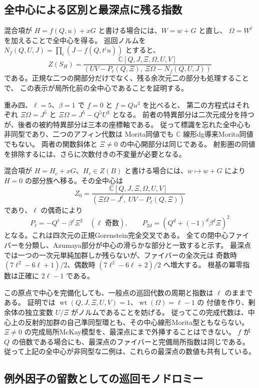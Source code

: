 \subsection{全中心による区別と最深点に残る指数}

混合項が $H=f(Q,u)+xG$ と書ける場合には、$W=w+G$ と直し、
$\Omega=W^\ell$ を加えることで全中心を得る。
巡回ノルムを $N_f(Q,U,J)=\prod_i(J-f(Q,t^iu))$ とすると、
\[
 Z(S_H)=\frac{\mathbb C[Q,J,\Xi,\Omega,U,V]}
 {(UV-P_\ell(Q,\Xi),\ \Xi\Omega-N_f(Q,U,J))}
\]
である。正規な二つの開部分だけでなく、残る余次元二の部分も処理することで、
この表示が局所化前の全中心であることを証明する。

重み四、$\ell=5$、$\beta=1$ で $f=0$ と $f=Qu^3$ を比べると、
第二の方程式はそれぞれ $\Xi\Omega=J^5$ と
$\Xi\Omega=J^5-Q^5U^3$ となる。
前者の特異部分は二次元成分を持つが、後者の被約特異部分は三本の座標軸である。
従って標識を忘れた全中心も非同型であり、二つのアフィン代数は
Morita同値でも $\mathbb C$ 線形dg導来Morita同値でもない。
両者の関数斜体と $\Xi\ne0$ の中心開部分は同じである。
射影圏の同値を排除するには、さらに次数付きの不変量が必要となる。

混合項が $H=H_c+xG$、$H_c\in Z(B)$ と書ける場合には、$w\mapsto w+G$ により
$H=0$ の部分族へ移る。その全中心は
\[
 Z_0=\frac{\mathbb C[Q,J,\Xi,\Omega,U,V]}
 {(\Xi\Omega-J^\ell,\ UV-P_\ell(Q,\Xi))}
\]
であり、$\ell$ の偶奇により
\[
 P_\ell=-Q^\ell-\beta^\ell\Xi^2\quad(\ell\text{ 奇数}),\qquad
 P_{2d}=(Q^d+(-1)^d\beta^d\Xi)^2
\]
となる。これは四次元の正規Gorenstein完全交叉である。
全ての閉中心ファイバーを分類し、Azumaya部分が中心の滑らかな部分と一致すると示す。
最深点では一つの一次元単純加群しか残らないが、ファイバーの全次元は
奇数時 $(7\ell^2-6\ell+1)/2$、偶数時 $(7\ell^2-6\ell+2)/2$ へ増大する。
根基の冪零指数は正確に $2\ell-1$ である。

この原点で中心を完備化しても、一般点の巡回代数の周期と指数は $\ell$ のままである。
証明では $\operatorname{wt}(Q,J,\Xi,U,V)=1$、$\operatorname{wt}(\Omega)=\ell-1$ の
付値を作り、剰余体の独立変数 $U/\Xi$ がノルムであることを妨げる。
従ってこの完成代数は、中心上の反射的加群の自己準同型環とも、その中心線形Morita型ともならない。
$\Xi\ne0$ の完成局所McKay模型を、最深点にまで外挿することはできない。
$f$ が $Q$ の倍数である場合にも、最深点のファイバーと完備局所指数は同じである。
従って上記の全中心が非同型な二例は、これらの最深点の数値も共有している。

\subsection{例外因子の留数としての巡回モノドロミー}

